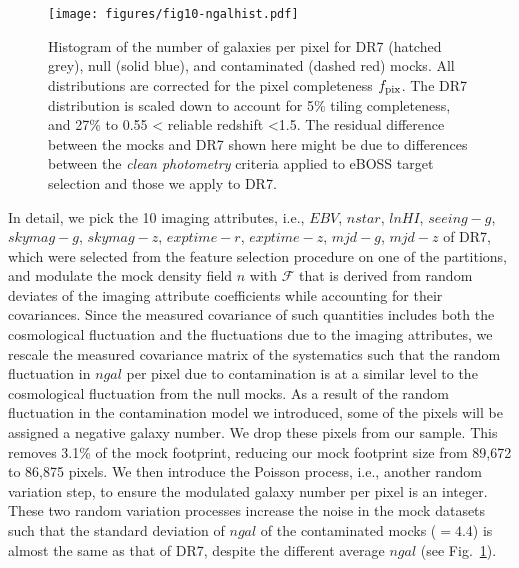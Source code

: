 \begin{figure}
    \centering
    \texttt{[image: figures/fig10-ngalhist.pdf]}
    \caption{Histogram of the number of galaxies per pixel for DR7 (hatched grey), null (solid blue), and contaminated (dashed red) mocks. All distributions are corrected for the pixel completeness $f_{\rm pix}$. The DR7 distribution is scaled down to account for 5\% tiling completeness, and 27\% to 0.55 < reliable redshift <1.5. The residual difference between the mocks and  DR7 shown here might be due to differences between the \textit{clean photometry} criteria applied to eBOSS target selection and those we apply to DR7.}
    \label{fig:ngal_hist}
\end{figure}

In detail, we pick the 10 imaging attributes, i.e., $EBV$, $nstar$, $lnHI$, $seeing-g$, $skymag-g$, $skymag-z$, $exptime-r$, $exptime-z$, $mjd-g$, $mjd-z$ of DR7, which were selected from the feature selection procedure on one of the partitions, and modulate the mock density field $n$ with $\mathcal{F}$ that is derived from random deviates of the imaging attribute coefficients while accounting for their covariances. Since the measured covariance of such quantities includes both the cosmological fluctuation and the fluctuations due to the imaging attributes, we rescale the measured covariance matrix of the systematics such that the random fluctuation in $ngal$ per pixel due to contamination is at a similar level to the cosmological fluctuation from the null mocks. As a result of the random fluctuation in the contamination model we introduced, some of the pixels will be assigned a negative galaxy number. We drop these pixels from our sample. This removes 3.1\% of the mock footprint, reducing our mock footprint size from 89,672 to 86,875 pixels. We then introduce the Poisson process, i.e., another random variation step, to ensure the modulated galaxy number per pixel is an integer. These two random variation processes increase the noise in the mock datasets such that the standard deviation of $ngal$ of the contaminated mocks ($=4.4$) is almost the same as that of DR7, despite the different average $ngal$ (see Fig.~\ref{fig:ngal_hist}).\\



